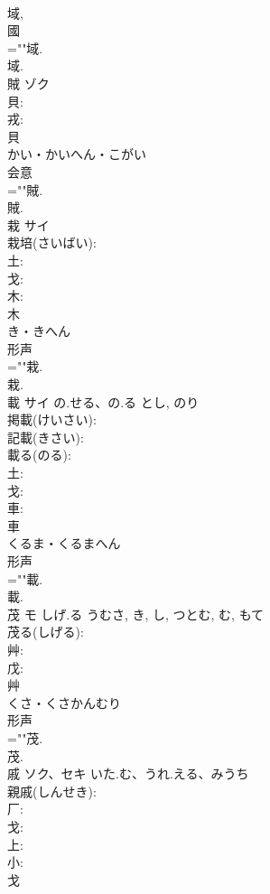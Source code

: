\documentclass[8pt]{extreport}
\begin{document}
\begin{CJK}{UTF8}{min}
\\	域, 
\\	國 
\\	=""域.
\\	域.
\\	賊	ゾク			
\\	貝: 
\\	戎: 
\\	貝	
\\	かい・かいへん・こがい	
\\	会意 
\\	=""賊.
\\	賊.
\\	栽	サイ			
\\	栽培(さいばい): 
\\	土: 
\\	戈: 
\\	木: 
\\	木	
\\	き・きへん	
\\	形声 
\\	=""栽.
\\	栽.
\\	載	サイ	の.せる、の.る	とし, のり	
\\	掲載(けいさい): 
\\	記載(きさい): 
\\	載る(のる): 
\\	土: 
\\	戈: 
\\	車: 
\\	車	
\\	くるま・くるまへん	
\\	形声 
\\	=""載.
\\	載.
\\	茂	モ	しげ.る	うむさ, き, し, つとむ, む, もて	
\\	茂る(しげる): 
\\	艸: 
\\	戊: 
\\	艸	
\\	くさ・くさかんむり	
\\	形声 
\\	=""茂.
\\	茂.
\\	戚	ソク、セキ	いた.む、うれ.える、みうち		
\\	親戚(しんせき): 
\\	厂: 
\\	戈: 
\\	上: 
\\	小: 
\\	戈	

\end{CJK}
\end{document}
